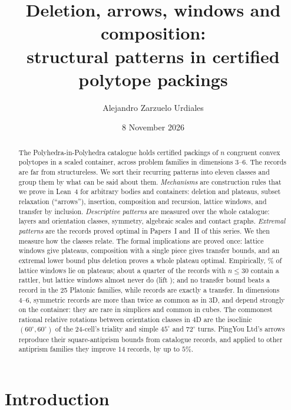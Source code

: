 \documentclass[11pt,a4paper]{article}
\title{Deletion, arrows, windows and composition:\\
structural patterns in \nRecords{} certified polytope packings}
\author{Alejandro Zarzuelo Urdiales}
\date{8 November 2026}
\begin{document}
\maketitle

\begin{abstract}
The Polyhedra-in-Polyhedra catalogue holds \nRecords{} certified packings of $n$ congruent convex polytopes in a scaled container, across \nFamilies{} problem families in dimensions 3--6. The records are far from structureless. We sort their recurring patterns into eleven classes and group them by what can be said about them. \emph{Mechanisms} are construction rules that we prove in Lean~4 for arbitrary bodies and containers: deletion and plateaus, subset relaxation (``arrows''), insertion, composition and recursion, lattice windows, and transfer by inclusion. \emph{Descriptive patterns} are measured over the whole catalogue: layers and orientation classes, symmetry, algebraic scales and contact graphs. \emph{Extremal patterns} are the \nProven{} records proved optimal in Papers~I and~II of this series. We then measure how the classes relate. The formal implications are proved once: lattice windows give plateaus, composition with a single piece gives transfer bounds, and an extremal lower bound plus deletion proves a whole plateau optimal. Empirically, \pWinPla{}\% of lattice windows lie on plateaus; about a quarter of the records with $n\le30$ contain a rattler, but lattice windows almost never do (lift \liftRatWin{}); and no transfer bound beats a record in the 25 Platonic families, while \nTrMatch{} records are exactly a transfer. In dimensions 4--6, symmetric records are more than twice as common as in 3D, and depend strongly on the container: they are rare in simplices and common in cubes. The commonest rational relative rotations between orientation classes in 4D are the isoclinic $(60^\circ,60^\circ)$ of the 24-cell's triality and simple $45^\circ$ and $72^\circ$ turns. PingYou Ltd's arrows reproduce their square-antiprism bounds from catalogue records, and applied to other antiprism families they improve 14 records, by up to $5\%$.
\end{abstract}

\tableofcontents

\section{Introduction}\label{sec:intro}
\end{document}
